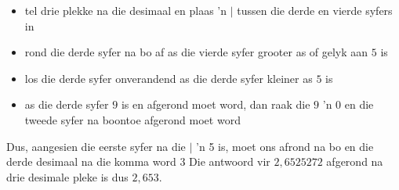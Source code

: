 \begin{itemize}
\item tel drie plekke na die desimaal en plaas 'n $|$ tussen die derde en vierde syfers in
\item rond die derde syfer na bo af as die vierde syfer grooter as of gelyk aan $5$ is
\item los die derde syfer onverandend as die derde syfer kleiner as $5$ is
\item as die derde syfer $9$ is en afgerond moet word, dan raak die $9$ 'n $0$ en die tweede syfer na boontoe afgerond moet word 
\end{itemize}
\par 
% 
% 
\par 
Dus, aangesien die eerste syfer na die $|$ 'n 5 is, moet ons afrond na bo en die derde desimaal na die komma word 3 Die antwoord vir $2,6525272$ afgerond na drie desimale pleke is dus $2,653$.
\par


